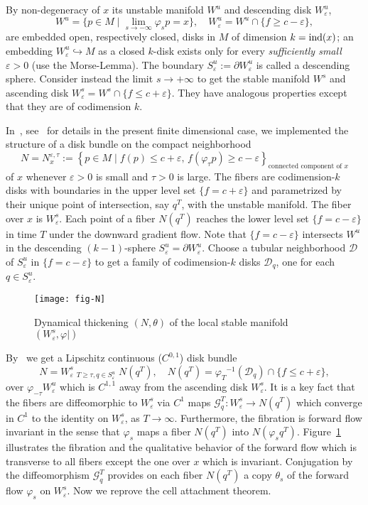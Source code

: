 \documentclass{article}
\theoremstyle{definition}
\theoremstyle{remark}
\renewcommand{\1}{{{\mathchoice {\rm 1\mskip-4mu l} {\rm 1\mskip-4mu l}
{\rm 1\mskip-4.5mu l} {\rm 1\mskip-5mu l}}}}
\newcommand{\Dd}{{\mathcal{D}}}
\newcommand{\Gg}{{\mathcal{G}}}   %
\newcommand{\IND}{{\rm ind}}       %
\newcommand{\eps}{{\varepsilon}}
\newcommand{\p}{{\partial}}
\begin{document}
By non-degeneracy of $x$ its unstable manifold
$W^u$ and descending disk $W^u_\eps$,
$$
     W^u=\{p\in M\mid\lim_{s\to-\infty}
     \varphi_sp=x\},\quad
    W^u_\eps=W^u\cap\{f\ge c-\eps\},
$$
are embedded open, respectively closed, disks in $M$ of
dimension $k=\IND(x)$; an embedding
$W^u_\eps\hookrightarrow M$ as a closed $k$-disk
exists only for every \emph{sufficiently small} $\eps>0$
(use the Morse-Lemma).
The boundary $S^u_\eps:=\p W^u_\eps$ is
called a descending sphere.
%
Consider instead the limit $s\to+\infty$
to get the stable manifold $W^s$
and ascending disk $W^s_\eps=W^s\cap\{f\le c+\eps\}$.
They have analogous properties
except that they are of codimension $k$.

In~\cite{weber:2014c}, see~\cite[Thm.~5.1]{Weber:2015c}
for details in the present finite dimensional case,
we implemented the structure of a disk bundle
on the compact neighborhood
$$
     N=N_x^{\eps,\tau}
     :=\left\{p\in M\mid\text{$f(p)\le c+\eps$,
     $f(\varphi_\tau p)\ge c-\eps$}\right\}
     _{\text{connected component of $x$}}
$$
of $x$ whenever $\eps>0$ is small and
$\tau>0$ is large.
The fibers are codimension-$k$ disks
with boundaries in the upper level set $\{f=c+\eps\}$
and parametrized by their unique point of
intersection, say $q^T$, with the unstable manifold.
The fiber over $x$ is $W^s_\eps$.
Each point of a fiber $N(q^T)$
reaches the lower level set
$\{f=c-\eps\}$ in time $T$ under the
downward gradient flow. Note that
$\{f=c-\eps\}$ intersects $W^u$
in the descending $(k-1)$-sphere
$S^u_\eps=\p W^u_\eps$.
%
Choose a tubular neighborhood $\Dd$ of
$S^u_\eps$ in $\{f=c-\eps\}$ to get a family
of codimension-$k$ disks $\Dd_q$, one for
each $q\in S^u_\eps$.
%
\begin{figure}%
  \centering
  \texttt{[image: fig-N]}
  \caption{Dynamical thickening $(N,\theta)$
                 of the local stable manifold $(W^s_\eps,\varphi|)$
           }
  \label{fig:fig-N}
\end{figure}
%
By~\cite{weber:2014c,Weber:2015c}
we get a Lipschitz continuous ($C^{0,1}$) disk bundle
\begin{equation*}\label{eq:N_a-foliated}
     N
     =W^s_\eps
     \mathop{\dot{\cup}}_{T\ge\tau,q\in S^u_\eps}
      N(q^{T}),
     \quad
      N(q^{T})={\varphi_{T}}^{-1}(\Dd_q)
     \cap\{f\le c+\eps\},
\end{equation*}
over $\varphi_{-\tau} W^u_\eps$
which is $C^{1,1}$ away from the ascending disk
$W^s_\eps$. It is a key fact that the fibers
are diffeomorphic to $W^s_\eps$ via $C^1$
maps $\Gg^T_q:W^s_\eps\to N(q^T)$
which converge in $C^1$ to the identity on
$W^s_\eps$, as $T\to\infty$.
Furthermore, the fibration is forward flow invariant in the
sense that $\varphi_s$ maps a fiber $ N(q^T)$
into $ N(\varphi_sq^T)$.
Figure~\ref{fig:fig-N} illustrates the fibration and
the qualitative behavior of the forward
flow which is transverse to all fibers except the one
over $x$ which is invariant.
Conjugation by the diffeomorphism $\Gg^T_q$
provides on each fiber $N(q^T)$
a copy $\theta_s$ of the forward flow
$\varphi_s$ on $W^s_\eps$.
%
Now we reprove the cell attachment theorem.
\end{document}
